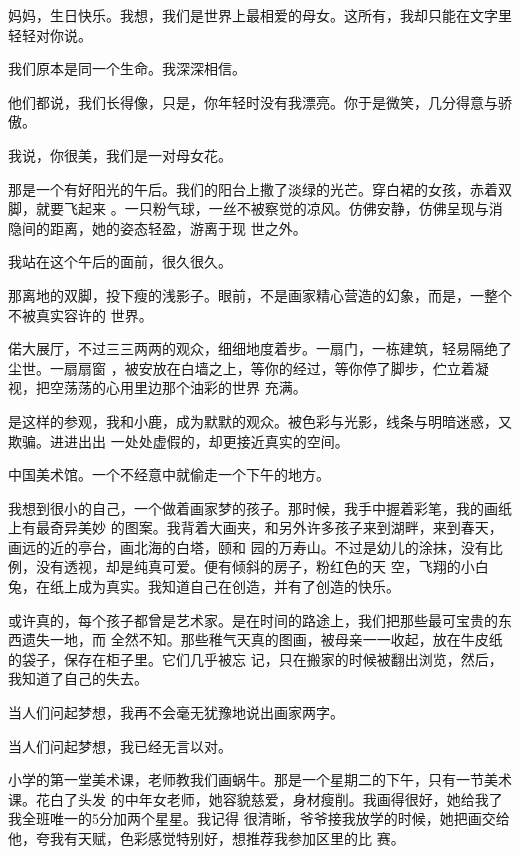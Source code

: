 \documentclass[12pt,a4paper]{article}
\begin{document}
		妈妈，生日快乐。我想，我们是世界上最相爱的母女。这所有，我却只能在文字里轻轻对你说。

		我们原本是同一个生命。我深深相信。


		他们都说，我们长得像，只是，你年轻时没有我漂亮。你于是微笑，几分得意与骄傲。

		我说，你很美，我们是一对母女花。

	\endwriting



		那是一个有好阳光的午后。我们的阳台上撒了淡绿的光芒。穿白裙的女孩，赤着双脚，就要飞起来
	。一只粉气球，一丝不被察觉的凉风。仿佛安静，仿佛呈现与消隐间的距离，她的姿态轻盈，游离于现
	世之外。

		我站在这个午后的面前，很久很久。

		那离地的双脚，投下瘦的浅影子。眼前，不是画家精心营造的幻象，而是，一整个不被真实容许的
	世界。

		偌大展厅，不过三三两两的观众，细细地度着步。一扇门，一栋建筑，轻易隔绝了尘世。一扇扇窗
	，被安放在白墙之上，等你的经过，等你停了脚步，伫立着凝视，把空荡荡的心用里边那个油彩的世界
	充满。

		是这样的参观，我和小鹿，成为默默的观众。被色彩与光影，线条与明暗迷惑，又欺骗。进进出出
	一处处虚假的，却更接近真实的空间。

		中国美术馆。一个不经意中就偷走一个下午的地方。

		我想到很小的自己，一个做着画家梦的孩子。那时候，我手中握着彩笔，我的画纸上有最奇异美妙
	的图案。我背着大画夹，和另外许多孩子来到湖畔，来到春天，画远的近的亭台，画北海的白塔，颐和
	园的万寿山。不过是幼儿的涂抹，没有比例，没有透视，却是纯真可爱。便有倾斜的房子，粉红色的天
	空，飞翔的小白兔，在纸上成为真实。我知道自己在创造，并有了创造的快乐。

		或许真的，每个孩子都曾是艺术家。是在时间的路途上，我们把那些最可宝贵的东西遗失一地，而
	全然不知。那些稚气天真的图画，被母亲一一收起，放在牛皮纸的袋子，保存在柜子里。它们几乎被忘
	记，只在搬家的时候被翻出浏览，然后，我知道了自己的失去。

		当人们问起梦想，我再不会毫无犹豫地说出画家两字。

		当人们问起梦想，我已经无言以对。

		小学的第一堂美术课，老师教我们画蜗牛。那是一个星期二的下午，只有一节美术课。花白了头发
	的中年女老师，她容貌慈爱，身材瘦削。我画得很好，她给我了我全班唯一的5分加两个星星。我记得
	很清晰，爷爷接我放学的时候，她把画交给他，夸我有天赋，色彩感觉特别好，想推荐我参加区里的比
	赛。
\end{document}
